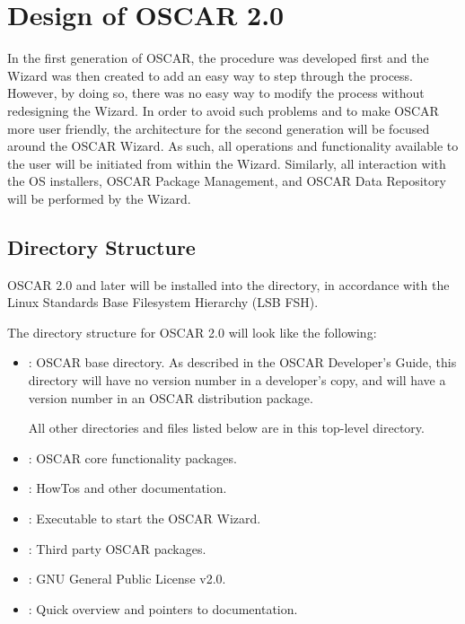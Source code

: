 %
%
%

\section{Design of OSCAR 2.0}

In the first generation of OSCAR, the procedure was developed first
and the Wizard was then created to add an easy way to step through the
process. However, by doing so, there was no easy way to modify the
process without redesigning the Wizard. In order to avoid such
problems and to make OSCAR more user friendly, the architecture for
the second generation will be focused around the OSCAR Wizard. As
such, all operations and functionality available to the user will be
initiated from within the Wizard. Similarly, all interaction with the
OS installers, OSCAR Package Management, and OSCAR Data Repository
will be performed by the Wizard.

\subsection{Directory Structure}

OSCAR 2.0 and later will be installed into the  directory,
in accordance with the Linux Standards Base Filesystem Hierarchy (LSB
FSH).

The directory structure for OSCAR 2.0 will look like the following:

\begin{itemize}
\item {}: OSCAR base directory.  As described
  in the OSCAR Developer's Guide, this directory will have no version
  number in a developer's copy, and will have a version number in an
  OSCAR distribution package.
  
  All other directories and files listed below are in this top-level
  directory.

\item {}: OSCAR core functionality packages.

\item {}: HowTos and other documentation.

\item {}: Executable to start the OSCAR Wizard.

\item {}: Third party OSCAR packages.

\item {}: GNU General Public License v2.0.
  
\item {}: Quick overview and pointers to documentation.
\end{itemize}

